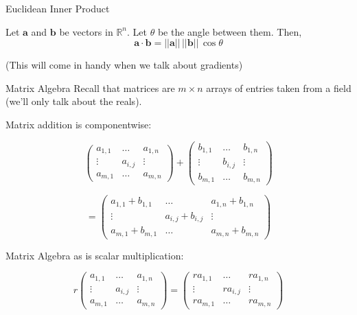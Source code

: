 \documentclass[11pt, xcolor={dvipsnames}, hyperref={colorlinks, allcolors=Blue}]{beamer}
\newcommand{\R}{\mathbb{R}}
\renewcommand{\a}{\mathbf{a}}
\renewcommand{\b}{\mathbf{b}}
\begin{document}
\begin{frame}{Euclidean Inner Product}

\begin{theorem}
Let $\a$ and $\b$ be vectors in $\R^{n}$. Let $\theta$ be the angle between them. Then,
\[ \a \cdot \b = ||\a|| \, ||\b|| \, \cos{\theta}\]
\end{theorem}
 (This will come in handy when we talk about gradients)


\end{frame}
\begin{frame}{Matrix Algebra}
 Recall that matrices are $m\times n$ arrays of entries taken from a field (we'll only talk about the reals).\bigskip

Matrix addition is componentwise:

\[
\begin{pmatrix}
a_{1,1} & \dots & a_{1,n}\\
\vdots & a_{i,j} & \vdots\\
a_{m,1} & \dots & a_{m,n}
\end{pmatrix} 
+
\begin{pmatrix}
b_{1,1} & \dots & b_{1,n}\\
\vdots & b_{i,j} & \vdots\\
b_{m,1} & \dots & b_{m,n}
\end{pmatrix} 
\]

\[= 
\begin{pmatrix}
a_{1,1} + b_{1,1} & \dots & a_{1,n} + b_{1,n}\\
\vdots & a_{i,j}+b_{i,j} & \vdots\\
a_{m,1} + b_{m,1} & \dots & a_{m,n} + b_{m,n}
\end{pmatrix} 
\]
\end{frame}
\begin{frame}{Matrix Algebra}
as is scalar multiplication:\bigskip

\[
r
\begin{pmatrix}
a_{1,1} & \dots & a_{1,n}\\
\vdots & a_{i,j} & \vdots\\
a_{m,1} & \dots & a_{m,n}
\end{pmatrix} 
= 
\begin{pmatrix}
ra_{1,1} & \dots & ra_{1,n}\\
\vdots & ra_{i,j} & \vdots\\
ra_{m,1} & \dots & ra_{m,n}
\end{pmatrix} 
\]


\end{frame}
\end{document}
